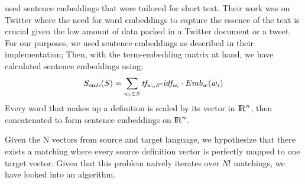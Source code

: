 \textcite{edilson_a._correa_nilc-usp_2017} used sentence embeddings that were tailored for short text.
Their work was on Twitter where the need for word embeddings to capture the essence of the text is crucial given the low amount of data packed in a Twitter document or a tweet.
For our purposes, we used sentence embeddings as described in their implementation;
Then, with the term-embedding matrix at hand, we have calculated sentence embeddings using;
\begin{equation}
    S_{\text{emb}}(S) = \sum_{w_{i} \in S} {\operatorname{\mathit{tf_{w_{i},S}-idf_{w_i}}}} \cdot Emb_{w}(w_{i})
\end{equation}
Every word that makes up a definition is scaled by its vector in ${\rm I\!R}^n$, then concatenated to form sentence embeddings on ${\rm I\!R}^n$.

Given the N vectors from source and target language, we hypothesize that there exists a matching where every source definition vector is perfectly mapped to one target vector.
Given that this problem naively iterates over $N!$ matchings, we have looked into an algorithm.



